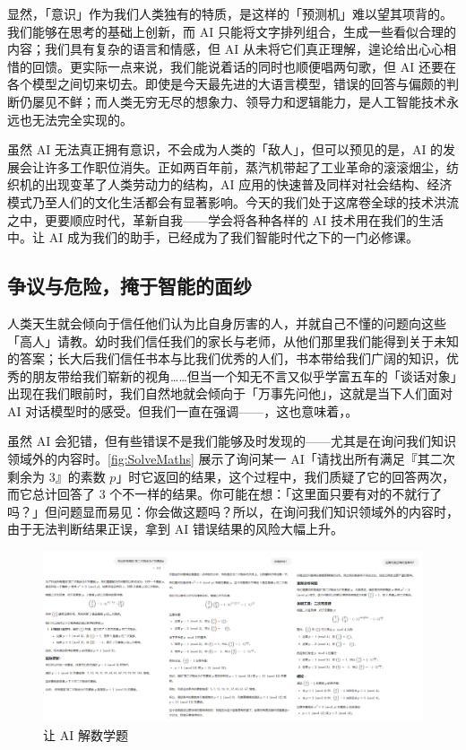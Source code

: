 显然，「意识」作为我们人类独有的特质，是这样的「预测机」难以望其项背的。我们能够在思考的基础上创新，而 AI 只能将文字排列组合，生成一些看似合理的内容；我们具有复杂的语言和情感，但 AI 从未将它们真正理解，遑论给出心心相惜的回馈。更实际一点来说，我们能说着话的同时也顺便唱两句歌，但 AI 还要在各个模型之间切来切去。即使是今天最先进的大语言模型，错误的回答与偏颇的判断仍屡见不鲜；而人类无穷无尽的想象力、领导力和逻辑能力，是人工智能技术永远也无法完全实现的。

虽然 AI 无法真正拥有意识，不会成为人类的「敌人」，但可以预见的是，AI 的发展会让许多工作职位消失。正如两百年前，蒸汽机带起了工业革命的滚滚烟尘，纺织机的出现变革了人类劳动力的结构，AI 应用的快速普及同样对社会结构、经济模式乃至人们的文化生活都会有显著影响。今天的我们处于这席卷全球的技术洪流之中，更要顺应时代，革新自我——学会将各种各样的 AI 技术用在我们的生活中。让 AI 成为我们的助手，已经成为了我们智能时代之下的一门必修课。

\subsection{争议与危险，掩于智能的面纱}

人类天生就会倾向于信任他们认为比自身厉害的人，并就自己不懂的问题向这些「高人」请教。幼时我们信任我们的家长与老师，从他们那里我们能得到关于未知的答案；长大后我们信任书本与比我们优秀的人们，书本带给我们广阔的知识，优秀的朋友带给我们崭新的视角……但当一个知无不言又似乎学富五车的「谈话对象」出现在我们眼前时，我们自然地就会倾向于「万事先问他」，这就是当下人们面对 AI 对话模型时的感受。但我们一直在强调——，这也意味着，。

虽然 AI 会犯错，但有些错误不是我们能够及时发现的——尤其是在询问我们知识领域外的内容时。\autoref{fig:SolveMaths} 展示了询问某一 AI「请找出所有满足『其二次剩余为 3』的素数 $p$」时它返回的结果，这个过程中，我们质疑了它的回答两次，而它总计回答了 3 个不一样的结果。你可能在想：「这里面只要有对的不就行了吗？」但问题显而易见：你会做这题吗？所以，在询问我们知识领域外的内容时，由于无法判断结果正误，拿到 AI 错误结果的风险大幅上升。

\begin{figure}[htb!]
  \centering
  \includegraphics[width=.95\textwidth]{assets/surpass/SolveMaths.png}
  \caption{让 AI 解数学题}
  \label{fig:SolveMaths}
\end{figure}

